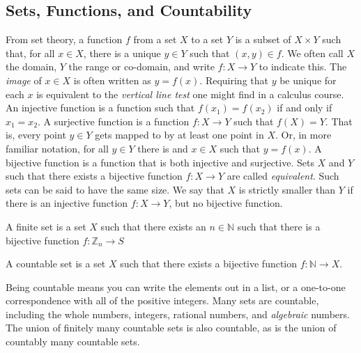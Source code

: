     \subsection{Sets, Functions, and Countability}
        From set theory, a function $f$ from a set $X$ to a
        set $Y$ is a subset of $X\times{Y}$ such that, for
        all $x\in{X}$, there is a unique $y\in{Y}$
        such that $(x,y)\in{f}$. We often call $X$ the
        domain, $Y$ the range or co-domain, and write
        $f:X\rightarrow{Y}$ to indicate this. The
        \textit{image} of $x\in{X}$ is often written
        as $y=f(x)$. Requiring that $y$ be unique for each
        $x$ is equivalent to the \textit{vertical line test}
        one might find in a calculus course.
        An injective function is a function such
        that $f(x_{1})=f(x_{2})$ if and only if $x_{1}=x_{2}$.
        A surjective function is a function $f:X\rightarrow{Y}$
        such that $f(X)=Y$. That is, every point $y\in{Y}$
        gets mapped to by at least one point in $X$. Or, in
        more familiar notation, for all $y\in{Y}$ there is
        and $x\in{X}$ such that $y=f(x)$. A bijective
        function is a function that is both injective and
        surjective. Sets $X$ and $Y$ such that there
        exists a bijective function $f:X\rightarrow{Y}$ are
        called \textit{equivalent}. Such sets can be said
        to have the same size. We say that $X$ is strictly
        smaller than $Y$ if there is an injective function
        $f:X\rightarrow{Y}$, but no bijective function.
        \begin{definition}
            A finite set is a set $X$ such that there
            exists an $n\in\mathbb{N}$ such that there is
            a bijective function
            $f:\mathbb{Z}_{n}\rightarrow{S}$
        \end{definition}
        \begin{definition}
            A countable set is a set
            $X$ such that there exists a bijective
            function $f:\mathbb{N}\rightarrow{X}$.
        \end{definition}
        Being countable means you can write
        the elements out in a list, or a
        one-to-one correspondence with all of
        the positive integers. Many sets are countable,
        including the whole numbers, integers, rational
        numbers, and \textit{algebraic} numbers. The
        union of finitely many countable sets is also
        countable, as is the union of countably many
        countable sets.
